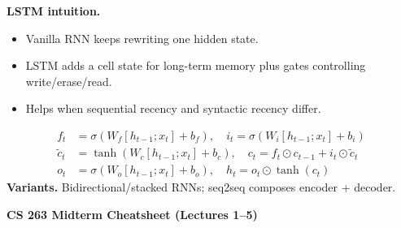 \documentclass[letterpaper,landscape]{article}
\newcommand{\mini}[1]{\textbf{#1}}
\newcommand{\eqline}[1]{\[
\displaystyle #1
\]}
\begin{document}
\begin{minipage}[t]{0.325\textwidth}
\mini{LSTM intuition.}
\begin{itemize}
\item Vanilla RNN keeps rewriting one hidden state.
\item LSTM adds a cell state for long-term memory plus gates controlling write/erase/read.
\item Helps when sequential recency and syntactic recency differ.
\end{itemize}
\eqline{
\begin{aligned}
f_t&=\sigma(W_f[h_{t-1};x_t]+b_f),\quad
i_t=\sigma(W_i[h_{t-1};x_t]+b_i)\\
\tilde c_t&=\tanh(W_c[h_{t-1};x_t]+b_c),\quad
c_t=f_t\odot c_{t-1}+i_t\odot \tilde c_t\\
o_t&=\sigma(W_o[h_{t-1};x_t]+b_o),\quad
h_t=o_t\odot\tanh(c_t)
\end{aligned}}
\mini{Variants.} Bidirectional/stacked RNNs; seq2seq composes encoder + decoder.
\end{minipage}

\clearpage
{\centering \textbf{CS 263 Midterm Cheatsheet (Lectures 1--5)}\par}
\vspace{2pt}
\end{document}
